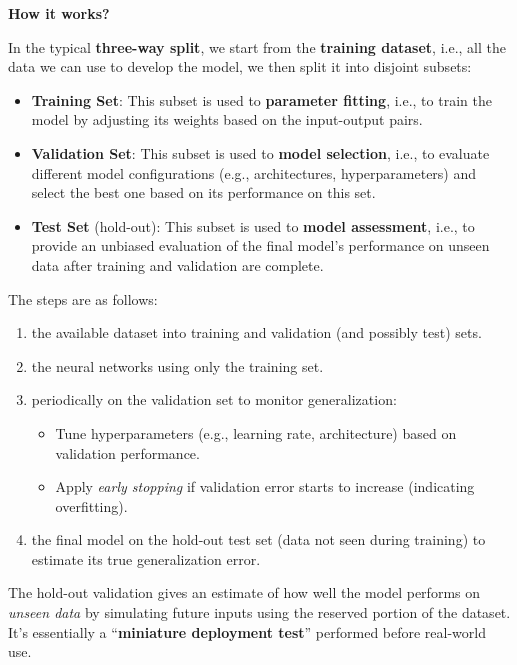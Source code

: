 \highspace
\begin{flushleft}
    \textcolor{Green3}{ \textbf{How it works?}}
\end{flushleft}
In the typical \textbf{three-way split}, we start from the \textbf{training dataset}, i.e., all the data we can use to develop the model, we then split it into disjoint subsets:
\begin{itemize}
    \item \textbf{Training Set}: This subset is used to \textbf{parameter fitting}, i.e., to train the model by adjusting its weights based on the input-output pairs.
    \item \textbf{Validation Set}: This subset is used to \textbf{model selection}, i.e., to evaluate different model configurations (e.g., architectures, hyperparameters) and select the best one based on its performance on this set.
    \item \textbf{Test Set} (hold-out): This subset is used to \textbf{model assessment}, i.e., to provide an unbiased evaluation of the final model's performance on unseen data after training and validation are complete.
\end{itemize}
The steps are as follows:
\begin{enumerate}
    \item {} the available dataset into training and validation (and possibly test) sets.
    \item {} the neural networks using only the training set.
    \item {} periodically on the validation set to monitor generalization:
    \begin{itemize}
        \item Tune hyperparameters (e.g., learning rate, architecture) based on validation performance.
        \item Apply \emph{early stopping} if validation error starts to increase (indicating overfitting).
    \end{itemize}
    \item {} the final model on the hold-out test set (data not seen during training) to estimate its true generalization error.
\end{enumerate}
The hold-out validation gives an estimate of how well the model performs on \emph{unseen data} by simulating future inputs using the reserved portion of the dataset. It's essentially a ``\textbf{miniature deployment test}'' performed before real-world use.

